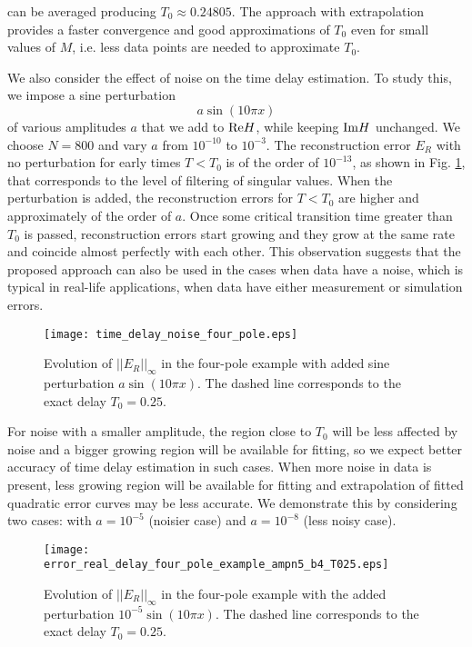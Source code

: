 \documentclass[journal,twoside]{IEEEtran}
\begin{document}
can be averaged producing $T_0\approx 0.24805$. The approach with extrapolation provides a faster convergence and good approximations of $T_0$ even for small values of $M$, i.e. less data points are needed to approximate $T_0$.

We also consider the effect of noise on the time delay estimation. To study this, we impose a sine perturbation
\begin{equation} \label{sine_pert}
a\sin(10\pi x)
\end{equation}
of various amplitudes $a$ that we add to ${\mathop{\rm Re}\nolimits} H$, while keeping ${\mathop{\rm Im}\nolimits} H$ unchanged. We choose $N=800$ 
and vary $a$ from $10^{-10}$ to $10^{-3}$. The reconstruction error $E_R$ with no perturbation for early times $T<T_0$ is of the order of $10^{-13}$, as shown in Fig. \ref{Ffour_pole4}, that corresponds to the level of filtering of singular values. When the perturbation is added, the reconstruction errors for $T<T_0$ are higher and approximately of the order of $a$. Once some critical transition time greater than $T_0$ is passed, reconstruction errors start growing and they grow at the same rate and coincide almost perfectly with each other. This observation suggests that the proposed approach can also be  used  in the cases when data have a noise, which is typical in real-life applications, when data have either measurement or simulation errors. 
\begin{figure}[h] \begin{center}
\texttt{[image: time\_delay\_noise\_four\_pole.eps]}
\end{center}
\caption{Evolution of $||E_R||_\infty$ in the four-pole example with added sine perturbation $a\sin(10\pi x)$. The dashed line corresponds to the exact delay $T_0=0.25$.} 
\label{Ffour_pole4}
\end{figure}
For noise with a smaller amplitude, the region close to $T_0$ will be less affected by noise and a bigger growing region will be available for fitting, so we expect better accuracy of time delay estimation in such cases. 
When more noise in data is present, less growing region will be available for fitting and extrapolation of fitted quadratic error curves may be less accurate.  We demonstrate this by considering two cases: with $a=10^{-5}$ (noisier case) and $a=10^{-8}$ (less noisy case).
\begin{figure}[h] \begin{center}
\texttt{[image: error\_real\_delay\_four\_pole\_example\_ampn5\_b4\_T025.eps]}
\end{center}
\caption{Evolution of  $||E_R||_\infty$ in the four-pole example with the added  perturbation $10^{-5}\sin(10\pi x)$. The dashed line corresponds to the exact delay $T_0=0.25$.} 
\label{Ffour_pole5}
\end{figure}
\end{document}
